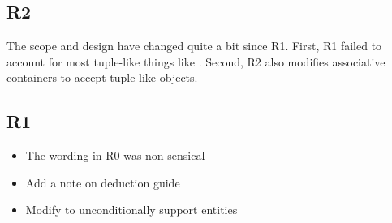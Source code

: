 \documentclass{wg21}
\begin{document}
\subsection{R2}

The scope and design have changed quite a bit since R1. First, R1 failed to account for most tuple-like things like .
Second, R2 also modifies associative containers to accept tuple-like objects.

\subsection{R1}
\begin{itemize}
    \item The wording in R0 was non-sensical
    \item Add a note on deduction guide
    \item Modify  to unconditionally support  entities
\end{itemize}

\pagebreak
\end{document}
